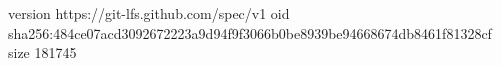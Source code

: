 version https://git-lfs.github.com/spec/v1
oid sha256:484ce07acd3092672223a9d94f9f3066b0be8939be94668674db8461f81328cf
size 181745

